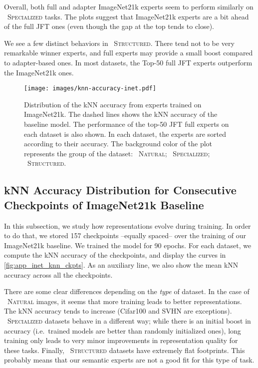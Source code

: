 \documentclass{article}
\newcommand{\naturalsym}{{\protect\scalebox{1.5}{\color{naturalcolor!50}}}}
\newcommand{\specializedsym}{{\protect\scalebox{1.5}{\color{specializedcolor!50}}}}
\newcommand{\structuredsym}{{\protect\scalebox{1.5}{\color{structuredcolor!50}}}}
\begin{document}
Overall, both full and adapter ImageNet21k experts seem to perform similarly on 
{\specializedsym~\textsc{Specialized}} tasks.
The plots suggest that ImageNet21k experts are a bit ahead of the full JFT ones 
(even though the gap at the top tends to close).


We see a few distinct behaviors in {\structuredsym~\textsc{Structured}}.
There tend not to be very remarkable winner experts, and full experts may provide a small boost compared to adapter-based ones.
In most datasets, the Top-50 full JFT experts outperform the ImageNet21k ones.


\begin{figure}[tb]
\centering
\texttt{[image: images/knn-accuracy-inet.pdf]}
\caption{Distribution of the kNN accuracy from experts trained on ImageNet21k. 
The dashed lines shows the kNN accuracy of the baseline model. 
The performance of the top-50 JFT full experts on each dataset is also shown.
In each dataset, the experts are sorted according to their accuracy.
The background color of the plot represents the group of the dataset:
\naturalsym~\textsc{Natural}; 
\specializedsym~\textsc{Specialized}; 
\structuredsym~\textsc{Structured}.
\label{fig:knn_accuracy_inet_distribution}}
\end{figure}


\clearpage
\subsection{kNN Accuracy Distribution for Consecutive Checkpoints of ImageNet21k Baseline}

In this subsection, we study how representations evolve during training.
In order to do that, we stored 157 checkpoints --equally spaced-- over the training of our ImageNet21k baseline.
We trained the model for 90 epochs.
For each dataset, we compute the kNN accuracy of the checkpoints, and display the curves in \cref{fig:app_inet_knn_ckpts}.
As an auxiliary line, we also show the mean kNN accuracy across all the checkpoints.

There are some clear differences depending on the \emph{type} of dataset.
In the case of {\naturalsym~\textsc{Natural}} images, it seems that more training leads to 
better representations.
The kNN accuracy tends to increase (Cifar100 and SVHN are exceptions).
{\specializedsym~\textsc{Specialized}} datasets behave in a different way; while there 
is an initial boost 
in accuracy (i.e.\ trained models are better than randomly initialized ones), long training
only leads to very minor improvements in representation quality for these tasks.
Finally, {\structuredsym~\textsc{Structured}} datasets have extremely flat footprints.
This probably means that our semantic experts are not a good fit for this type of task.
\end{document}
